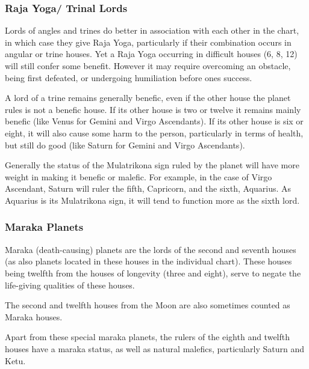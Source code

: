  

\subsubsection{Raja Yoga/ Trinal Lords}

 

Lords of angles and trines do better in association with each other in the chart, in which case they give Raja Yoga, particularly if their combination occurs in angular or trine houses. Yet a Raja Yoga occurring in difficult houses (6, 8, 12) will still confer some benefit. However it may require overcoming an obstacle, being first defeated, or undergoing humiliation before ones success.

 

A lord of a trine remains generally benefic, even if the other house the planet rules is not a benefic house. If its other house is two or twelve it remains mainly benefic (like Venus for Gemini and Virgo Ascendants). If its other house is six or eight, it will also cause some harm to the person, particularly in terms of health, but still do good (like Saturn for Gemini and Virgo Ascendants).

 

Generally the status of the Mulatrikona sign ruled by the planet will have more weight in making it benefic or malefic. For example, in the case of Virgo Ascendant, Saturn will ruler the fifth, Capricorn, and the sixth, Aquarius. As Aquarius is its Mulatrikona sign, it will tend to function more as the sixth lord.

 

\subsubsection{Maraka Planets}

 

Maraka (death-causing) planets are the lords of the second and seventh houses (as also planets located in these houses in the individual chart). These houses being twelfth from the houses of longevity (three and eight), serve to negate the life-giving qualities of these houses.

 

The second and twelfth houses from the Moon are also sometimes counted as Maraka houses.

 

Apart from these special maraka planets, the rulers of the eighth and twelfth houses have a maraka status, as well as natural malefics, particularly Saturn and Ketu.

